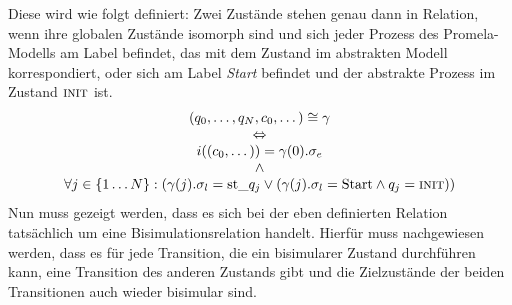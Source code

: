 Diese wird wie folgt definiert:
Zwei Zustände stehen genau dann in Relation, wenn ihre globalen Zustände isomorph sind und sich jeder Prozess des Promela-Modells am Label befindet, das mit dem Zustand im abstrakten Modell korrespondiert, oder sich am Label \emph{Start} befindet und der abstrakte Prozess im Zustand $\textnormal{\scshape init}$ ist.
\[
\begin{array}{c}
  (q_0,\dots,q_N,c_0,\dots)\cong \gamma\\
  \Leftrightarrow\\
  i((c_0,\dots))=\gamma(0).\sigma_e\\
  \land\\
  \forall j\in\{1\dots N\}: (\gamma(j).\sigma_l = \textrm{st\_}q_j \lor (\gamma(j).\sigma_l = \textrm{Start}\land q_j=\const{init}))
\end{array}
\]
Nun muss gezeigt werden, dass es sich bei der eben definierten Relation tatsächlich um eine Bisimulationsrelation handelt.
Hierfür muss nachgewiesen werden, dass es für jede Transition, die ein bisimularer Zustand durchführen kann, eine Transition des anderen Zustands gibt und die Zielzustände der beiden Transitionen auch wieder bisimular sind.

